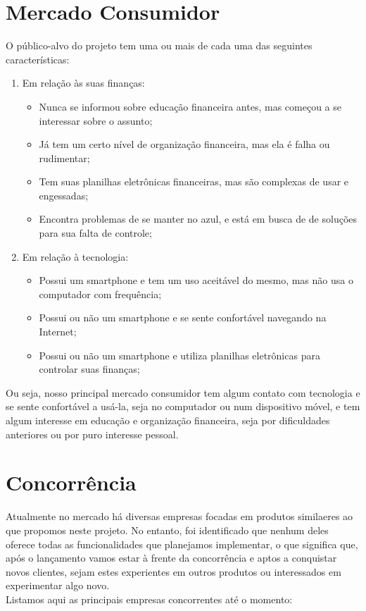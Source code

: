 \documentclass[a4paper]{abnt}
\begin{document}
\section{Mercado Consumidor}
\label{sec:mercado}
O público-alvo do projeto tem uma ou mais de cada uma das seguintes características:
\begin{enumerate}
	\item Em relação às suas finanças:
		\begin{itemize}
			\item Nunca se informou sobre educação financeira antes, mas começou a se interessar sobre o assunto;
			\item Já tem um certo nível de organização financeira, mas ela é falha ou rudimentar;
			\item Tem suas planilhas eletrônicas financeiras, mas são complexas de usar e engessadas;
			\item Encontra problemas de se manter no azul, e está em busca de de soluções para sua falta de controle;
		\end{itemize}
	\item Em relação à tecnologia:
		\begin{itemize}
			\item Possui um smartphone e tem um uso aceitável do mesmo, mas não usa o computador com frequência;
			\item Possui ou não um smartphone e se sente confortável navegando na Internet;
			\item Possui ou não um smartphone e utiliza planilhas eletrônicas para controlar suas finanças;
		\end{itemize}
\end{enumerate}

Ou seja, nosso principal mercado consumidor tem algum contato com tecnologia e se sente confortável a usá-la, seja no computador ou num dispositivo móvel, e tem algum interesse em educação e organização financeira, seja por dificuldades anteriores ou por puro interesse pessoal.

\section{Concorrência}
Atualmente no mercado há diversas empresas focadas em produtos similaeres ao que propomos neste projeto. No entanto, foi identificado que nenhum deles oferece todas as funcionalidades que planejamos implementar, o que significa que, após o lançamento vamos estar à frente da concorrência e aptos a conquistar novos clientes, sejam estes experientes em outros produtos ou interessados em experimentar algo novo.\\
Listamos aqui as principais empresas concorrentes até o momento:
\end{document}

